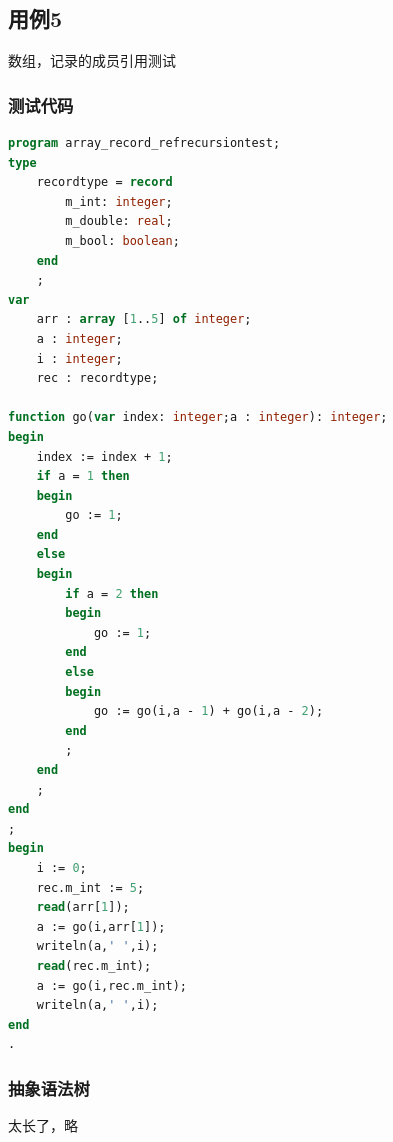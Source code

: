 \documentclass{article}
\begin{document}
\subsection{用例5}
\par 数组，记录的成员引用测试
\subsubsection{测试代码}
\begin{lstlisting}[language=pascal,showstringspaces=false]
program array_record_refrecursiontest;
type
	recordtype = record
		m_int: integer;
		m_double: real;
		m_bool: boolean;
	end
    ;
var
	arr : array [1..5] of integer;
    a : integer;
    i : integer;
	rec : recordtype;
    
function go(var index: integer;a : integer): integer;
begin
    index := index + 1;
	if a = 1 then
	begin
		go := 1;
	end
	else
	begin
		if a = 2 then
		begin
			go := 1;
		end
		else
		begin
			go := go(i,a - 1) + go(i,a - 2);
		end
		;
	end
	;
end
;
begin
    i := 0;
    rec.m_int := 5;
    read(arr[1]);
    a := go(i,arr[1]);
    writeln(a,' ',i);
    read(rec.m_int);
    a := go(i,rec.m_int);
    writeln(a,' ',i);
end
.
\end{lstlisting}

\subsubsection{抽象语法树}

\par 太长了，略
\end{document}
